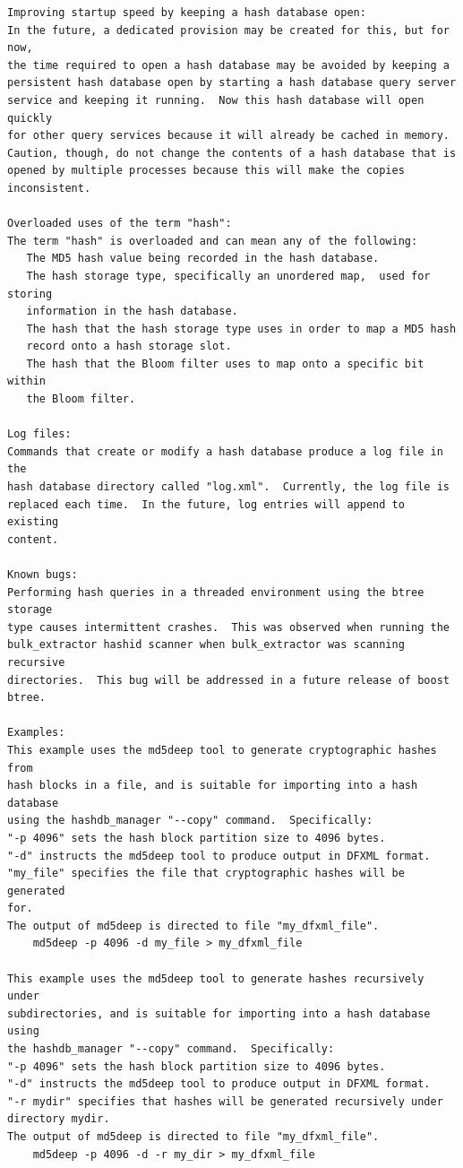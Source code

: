 \documentclass[11pt,twoside]{article}
\begin{document}
\begin{small}
\begin{verbatim}
Improving startup speed by keeping a hash database open:
In the future, a dedicated provision may be created for this, but for now,
the time required to open a hash database may be avoided by keeping a
persistent hash database open by starting a hash database query server
service and keeping it running.  Now this hash database will open quickly
for other query services because it will already be cached in memory.
Caution, though, do not change the contents of a hash database that is
opened by multiple processes because this will make the copies inconsistent.

Overloaded uses of the term "hash":
The term "hash" is overloaded and can mean any of the following:
   The MD5 hash value being recorded in the hash database.
   The hash storage type, specifically an unordered map,  used for storing
   information in the hash database.
   The hash that the hash storage type uses in order to map a MD5 hash
   record onto a hash storage slot.
   The hash that the Bloom filter uses to map onto a specific bit within
   the Bloom filter.

Log files:
Commands that create or modify a hash database produce a log file in the
hash database directory called "log.xml".  Currently, the log file is
replaced each time.  In the future, log entries will append to existing
content.

Known bugs:
Performing hash queries in a threaded environment using the btree storage
type causes intermittent crashes.  This was observed when running the
bulk_extractor hashid scanner when bulk_extractor was scanning recursive
directories.  This bug will be addressed in a future release of boost
btree.

Examples:
This example uses the md5deep tool to generate cryptographic hashes from
hash blocks in a file, and is suitable for importing into a hash database
using the hashdb_manager "--copy" command.  Specifically:
"-p 4096" sets the hash block partition size to 4096 bytes.
"-d" instructs the md5deep tool to produce output in DFXML format.
"my_file" specifies the file that cryptographic hashes will be generated
for.
The output of md5deep is directed to file "my_dfxml_file".
    md5deep -p 4096 -d my_file > my_dfxml_file

This example uses the md5deep tool to generate hashes recursively under
subdirectories, and is suitable for importing into a hash database using
the hashdb_manager "--copy" command.  Specifically:
"-p 4096" sets the hash block partition size to 4096 bytes.
"-d" instructs the md5deep tool to produce output in DFXML format.
"-r mydir" specifies that hashes will be generated recursively under
directory mydir.
The output of md5deep is directed to file "my_dfxml_file".
    md5deep -p 4096 -d -r my_dir > my_dfxml_file


\end{verbatim}
\end{small}
\end{document}
